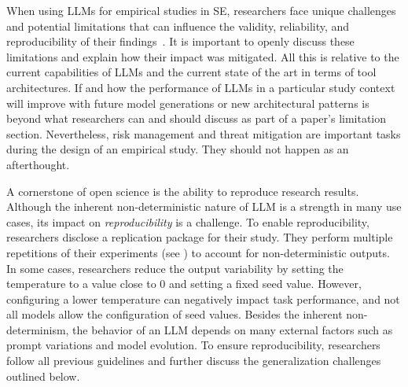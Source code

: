 When using LLMs for empirical studies in SE, researchers face unique challenges and potential limitations that can influence the validity, reliability, and reproducibility of their findings~\cite{sallou2024breaking}.
It is important to openly discuss these limitations and explain how their impact was mitigated.
All this is relative to the current capabilities of LLMs and the current state of the art in terms of tool architectures.
If and how the performance of LLMs in a particular study context will improve with future model generations or new architectural patterns is beyond what researchers can and should discuss as part of a paper's limitation section.
Nevertheless, risk management and threat mitigation are important tasks during the design of an empirical study.
They should not happen as an afterthought.


A cornerstone of open science is the ability to reproduce research results.
Although the inherent non-deterministic nature of LLM is a strength in many use cases, its impact on \emph{reproducibility} is a challenge.
To enable reproducibility, researchers \should disclose a replication package for their study.
They \should perform multiple repetitions of their experiments (see \benchmarksmetrics) to account for non-deterministic outputs.
In some cases, researchers \may reduce the output variability by setting the temperature to a value close to 0 and setting a fixed seed value.
However, configuring a lower temperature can negatively impact task performance, and not all models allow the configuration of seed values.
Besides the inherent non-determinism, the behavior of an LLM depends on many external factors such as prompt variations and model evolution.
To ensure reproducibility, researchers \should follow all previous guidelines and further discuss the generalization challenges outlined below.

